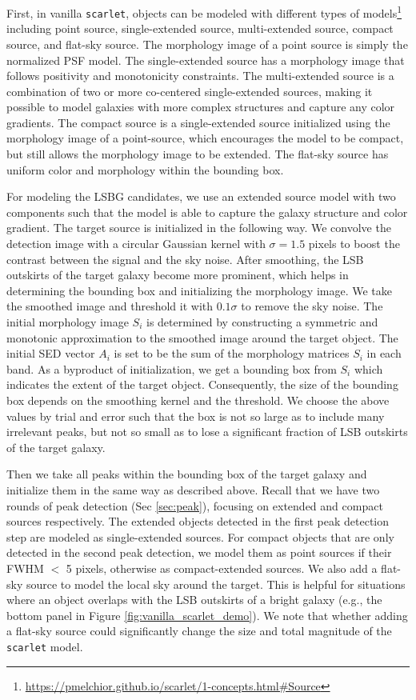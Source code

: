 \documentclass[twocolumn,astrosymb,twocolappendix]{aastex631}
\newcommand{\code}[1]{\texttt{#1}}
\begin{document}
\begin{CJK*}{UTF8}{gbsn}
First, in vanilla \code{scarlet}, objects can be modeled with different types of models\footnote{\url{https://pmelchior.github.io/scarlet/1-concepts.html\#Source}} including point source, single-extended source, multi-extended source, compact source, and flat-sky source. The morphology image of a point source is simply the normalized PSF model. The single-extended source has a morphology image that follows positivity and monotonicity constraints. The multi-extended source is a combination of two or more co-centered single-extended sources, making it possible to model galaxies with more complex structures and capture any color gradients. The compact source is a single-extended source initialized using the morphology image of a point-source, which encourages the model to be compact, but still allows the morphology image to be extended. The flat-sky source has uniform color and morphology within the bounding box.

For modeling the LSBG candidates, we use an extended source model with two components such that the model is able to capture the galaxy structure and color gradient. The target source is initialized in the following way. We convolve the detection image with a circular Gaussian kernel with $\sigma=1.5$ pixels to boost the contrast between the signal and the sky noise. After smoothing, the LSB outskirts of the target galaxy become more prominent, which helps in determining the bounding box and initializing the morphology image. We take the smoothed image and threshold it with $0.1\sigma$ to remove the sky noise. The initial morphology image $S_i$ is determined by constructing a symmetric and monotonic approximation to the smoothed image around the target object. The initial SED vector $A_i$ is set to be the sum of the morphology matrices $S_i$ in each band. As a byproduct of initialization, we get a bounding box from $S_i$ which indicates the extent of the target object. Consequently, the size of the bounding box depends on the smoothing kernel and the threshold. We choose the above values by trial and error such that the box is not so large as to include many irrelevant peaks, but not so small as to lose a significant fraction of LSB outskirts of the target galaxy. 

Then we take all peaks within the bounding box of the target galaxy and initialize them in the same way as described above. Recall that we have two rounds of peak detection (Sec \ref{sec:peak}), focusing on extended and compact sources respectively. The extended objects detected in the first peak detection step are modeled as single-extended sources. For compact objects that are only detected in the second peak detection, we model them as point sources if their FWHM $<$ 5 pixels, otherwise as compact-extended sources. We also add a flat-sky source to model the local sky around the target. This is helpful for situations where an object overlaps with the LSB outskirts of a bright galaxy (e.g., the bottom panel in Figure \ref{fig:vanilla_scarlet_demo}). We note that whether adding a flat-sky source could significantly change the size and total magnitude of the \code{scarlet} model.


\end{CJK*}
\end{document}
